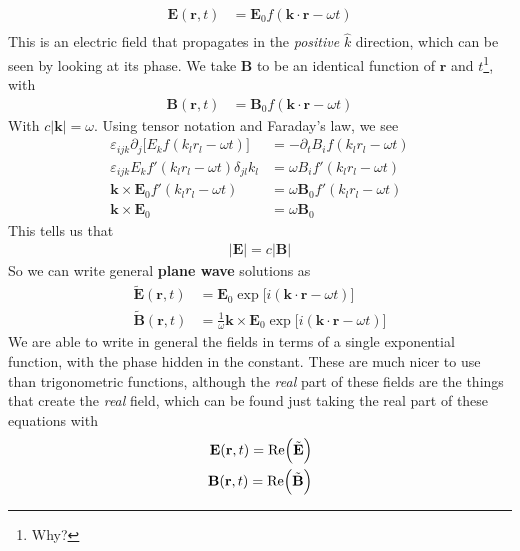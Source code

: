 \begin{align}
\textbf{E}(\textbf{r},t) &= \textbf{E}_0 f(\textbf{k}\cdot\textbf{r} -\omega t)\\
\end{align}
This is an electric field that propagates in the \emph{positive} $\hat{k}$ direction, which can be seen by looking at its phase. We take  $\textbf{B}$ to be an identical function of $\textbf{r}$ and $t$\footnote{Why?}, with
\begin{align}
\textbf{B}(\textbf{r},t) &= \textbf{B}_0 f(\textbf{k}\cdot\textbf{r} -\omega t)
\end{align}
With $c|\textbf{k}| = \omega$. Using tensor notation and Faraday's law, we see
\begin{align}
\varepsilon_{ijk}\partial_j\Big[E_k f(k_lr_l-\omega t)\Big] &= -\partial_tB_if(k_lr_l-\omega t)\\
\varepsilon_{ijk}E_kf'(k_lr_l-\omega t)\delta_{jl}k_l &= \omega B_if'(k_lr_l-\omega t)\\
\textbf{k}\times\textbf{E}_0f'(k_lr_l-\omega t) &= \omega \textbf{B}_0f'(k_lr_l-\omega t)\\
\textbf{k}\times\textbf{E}_0 &= \omega \textbf{B}_0
\end{align}
This tells us that
\begin{align}
|\textbf{E}| = c|\textbf{B}|
\end{align}
So we can write general \textbf{plane wave} solutions as
\begin{align}
\tilde{\textbf{E}}(\textbf{r},t) &= \textbf{E}_0\exp\Big[i(\textbf{k}\cdot\textbf{r}-\omega t)\Big]\\
\tilde{\textbf{B}}(\textbf{r},t) &= \frac{1}{\omega}\textbf{k}\times\textbf{E}_0\exp\Big[i(\textbf{k}\cdot\textbf{r}-\omega t)\Big]
\end{align}
We are able to write in general the fields in terms of a single exponential function, with the phase hidden in the constant. These are much nicer to use than trigonometric functions, although the \emph{real} part of these fields are the things that create the \emph{real} field, which can be found just taking the real part of these equations with
\begin{align}
    \textbf{E}(\textbf{r},t) = \rm{Re}\Big(\tilde{\textbf{E}}\Big)\\
    \textbf{B}(\textbf{r},t) = \rm{Re}\Big(\tilde{\textbf{B}}\Big)
\end{align}



